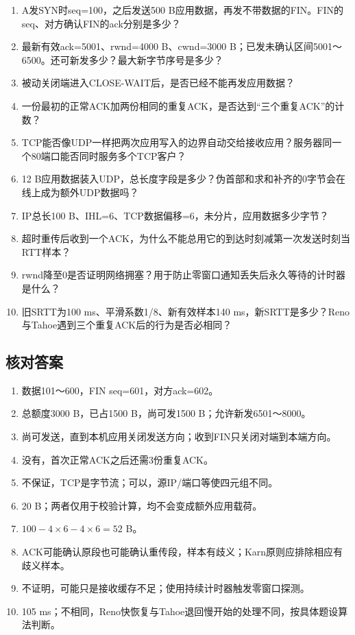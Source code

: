 \begin{enumerate}
\def\labelenumi{\arabic{enumi}.}
\tightlist
\item
  A发SYN时seq=100，之后发送500 B应用数据，再发不带数据的FIN。FIN的seq、对方确认FIN的ack分别是多少？
\item
  最新有效ack=5001、rwnd=4000 B、cwnd=3000 B；已发未确认区间5001～6500。还可新发多少？最大新字节序号是多少？
\item
  被动关闭端进入CLOSE-WAIT后，是否已经不能再发应用数据？
\item
  一份最初的正常ACK加两份相同的重复ACK，是否达到``三个重复ACK''的计数？
\item
  TCP能否像UDP一样把两次应用写入的边界自动交给接收应用？服务器同一个80端口能否同时服务多个TCP客户？
\item
  12 B应用数据装入UDP，总长度字段是多少？伪首部和求和补齐的0字节会在线上成为额外UDP数据吗？
\item
  IP总长100 B、IHL=6、TCP数据偏移=6，未分片，应用数据多少字节？
\item
  超时重传后收到一个ACK，为什么不能总用它的到达时刻减第一次发送时刻当RTT样本？
\item
  rwnd降至0是否证明网络拥塞？用于防止零窗口通知丢失后永久等待的计时器是什么？
\item
  旧SRTT为100 ms、平滑系数1/8、新有效样本140 ms，新SRTT是多少？Reno与Tahoe遇到三个重复ACK后的行为是否必相同？
\end{enumerate}

\subsection{核对答案}\label{CN05-review-answers}

\begin{enumerate}
\def\labelenumi{\arabic{enumi}.}
\tightlist
\item
  数据101～600，FIN seq=601，对方ack=602。
\item
  总额度3000 B，已占1500 B，尚可发1500 B；允许新发6501～8000。
\item
  尚可发送，直到本机应用关闭发送方向；收到FIN只关闭对端到本端方向。
\item
  没有，首次正常ACK之后还需3份重复ACK。
\item
  不保证，TCP是字节流；可以，源IP/端口等使四元组不同。
\item
  20 B；两者仅用于校验计算，均不会变成额外应用载荷。
\item
  \(100-4\times6-4\times6=52\) B。
\item
  ACK可能确认原段也可能确认重传段，样本有歧义；Karn原则应排除相应有歧义样本。
\item
  不证明，可能只是接收缓存不足；使用持续计时器触发零窗口探测。
\item
  105 ms；不相同，Reno快恢复与Tahoe退回慢开始的处理不同，按具体题设算法判断。
\end{enumerate}
